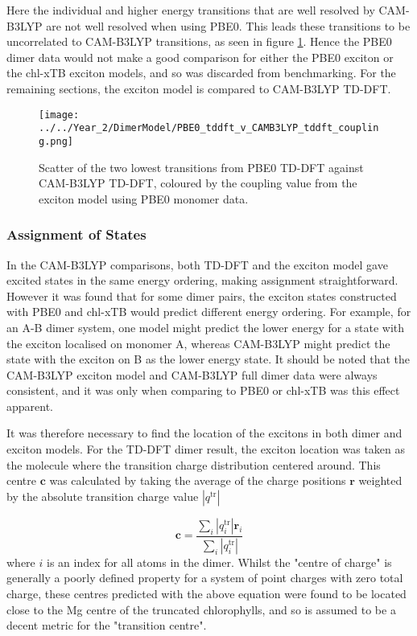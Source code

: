 Here the individual \Qy and higher energy transitions that are well resolved by CAM-B3LYP
are not well resolved when using PBE0. This leads these transitions to be uncorrelated 
to CAM-B3LYP transitions, as seen in figure \ref{fig:pbe0_camb3lyp_coupling}. Hence
the PBE0 dimer data would not make a good comparison for either the PBE0 exciton 
or the chl-xTB exciton models, and so was discarded from benchmarking. For the remaining
sections, the exciton model is compared to CAM-B3LYP TD-DFT.

\begin{figure}
    \centering
    \texttt{[image: ../../Year\_2/DimerModel/PBE0\_tddft\_v\_CAMB3LYP\_tddft\_coupling.png]}
    \label{fig:pbe0_camb3lyp_coupling}
    \caption{Scatter of the two lowest transitions from PBE0 TD-DFT against CAM-B3LYP
    TD-DFT, coloured by the coupling value from the exciton model using PBE0 monomer 
    data.}
\end{figure}

\afterpartskip
\subsubsection{Assignment of States}
\label{subsec:state_assign}

In the CAM-B3LYP comparisons, both TD-DFT and the exciton model gave excited states
in the same energy ordering, making assignment straightforward. However it was found
that for some dimer pairs, the exciton states constructed with PBE0 and chl-xTB
would predict different energy ordering. For example, for an A-B  dimer system,
one model might predict the lower energy for a state with the exciton localised 
on monomer A, whereas CAM-B3LYP might predict the state with the exciton on B as
the lower energy state. It should be noted that the CAM-B3LYP exciton model and CAM-B3LYP 
full dimer data were always consistent, and it was only when comparing to PBE0 or
chl-xTB was this effect apparent.

It was therefore necessary to find the location of the excitons in both dimer and
exciton models. For the TD-DFT dimer result, the exciton location was taken as the
molecule where the transition charge distribution centered around. This centre
$\mathbf{c}$ was calculated by taking the average of the charge positions $\mathbf{r}$
weighted by the absolute transition charge value $\left\lvert q^{\text{tr}} \right\rvert$

\begin{equation}
    \mathbf{c} = \frac{\sum_i \left\lvert q^{\text{tr}}_i \right\rvert \mathbf{r}_i}{\sum_i \left\lvert q^{\text{tr}}_i \right\rvert}
\end{equation}
%
where $i$ is an index for all atoms in the dimer. Whilst the "centre of charge"
is generally a poorly defined property for a system of point charges with zero total
charge, these centres predicted with the above equation were found to be located close
to the Mg centre of the truncated chlorophylls, and so is assumed to be a decent
metric for the "transition centre".

